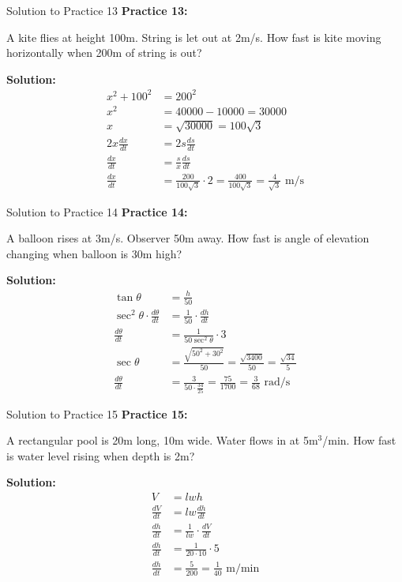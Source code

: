 \documentclass[aspectratio=169]{beamer}
\begin{document}
\begin{frame}{Solution to Practice 13}
\textbf{Practice 13:}

A kite flies at height 100m. String is let out at 2m/s. How fast is kite moving horizontally when 200m of string is out?

\textbf{Solution:}
\[
\begin{aligned}
  x^2 + 100^2 &= 200^2 \\
  x^2 &= 40000 - 10000 = 30000 \\
  x &= \sqrt{30000} = 100\sqrt{3} \\
  2x\frac{dx}{dt} &= 2s\frac{ds}{dt} \\
  \frac{dx}{dt} &= \frac{s}{x}\frac{ds}{dt} \\
  \frac{dx}{dt} &= \frac{200}{100\sqrt{3}} \cdot 2 = \frac{400}{100\sqrt{3}} = \frac{4}{\sqrt{3}} \text{ m/s}
\end{aligned}
\]
\end{frame}

\begin{frame}{Solution to Practice 14}
\textbf{Practice 14:}

A balloon rises at 3m/s. Observer 50m away. How fast is angle of elevation changing when balloon is 30m high?

\textbf{Solution:}
\[
\begin{aligned}
  \tan \theta &= \frac{h}{50} \\
  \sec^2 \theta \cdot \frac{d\theta}{dt} &= \frac{1}{50} \cdot \frac{dh}{dt} \\
  \frac{d\theta}{dt} &= \frac{1}{50 \sec^2 \theta} \cdot 3 \\
  \sec \theta &= \frac{\sqrt{50^2 + 30^2}}{50} = \frac{\sqrt{3400}}{50} = \frac{\sqrt{34}}{5} \\
  \frac{d\theta}{dt} &= \frac{3}{50 \cdot \frac{34}{25}} = \frac{75}{1700} = \frac{3}{68} \text{ rad/s}
\end{aligned}
\]
\end{frame}

\begin{frame}{Solution to Practice 15}
\textbf{Practice 15:}

A rectangular pool is 20m long, 10m wide. Water flows in at 5m$^3$/min. How fast is water level rising when depth is 2m?

\textbf{Solution:}
\[
\begin{aligned}
  V &= lwh \\
  \frac{dV}{dt} &= lw\frac{dh}{dt} \\
  \frac{dh}{dt} &= \frac{1}{lw} \cdot \frac{dV}{dt} \\
  \frac{dh}{dt} &= \frac{1}{20 \cdot 10} \cdot 5 \\
  \frac{dh}{dt} &= \frac{5}{200} = \frac{1}{40} \text{ m/min}
\end{aligned}
\]
\end{frame}
\end{document}
